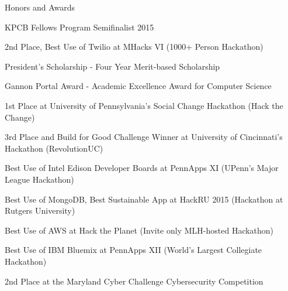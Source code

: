 \documentclass{resume} %
\begin{document}

\begin{rHonorsSection}{Honors and Awards}
\item KPCB Fellows Program Semifinalist 2015
\item 2nd Place, Best Use of Twilio at MHacks VI (1000+ Person Hackathon)
\item President's Scholarship - Four Year Merit-based Scholarship
\item Gannon Portal Award - Academic Excellence Award for Computer Science
\item 1st Place at University of Pennsylvania's Social Change Hackathon (Hack the Change)
\item 3rd Place and Build for Good Challenge Winner at University of Cincinnati's Hackathon (RevolutionUC)
\item Best Use of Intel Edison Developer Boards at PennApps XI (UPenn's Major League Hackathon)
\item Best Use of MongoDB, Best Sustainable App at HackRU 2015 (Hackathon at Rutgers University)
\item Best Use of AWS at Hack the Planet (Invite only MLH-hosted Hackathon)
\item Best Use of IBM Bluemix at PennApps XII (World's Largest Collegiate Hackathon)
\item 2nd Place at the Maryland Cyber Challenge Cybersecurity Competition

\end{rHonorsSection}

\end{document}
